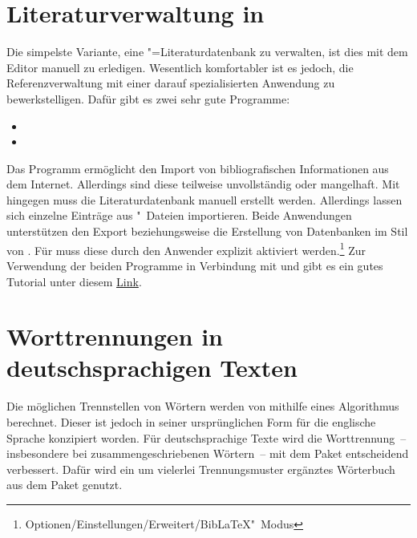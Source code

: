 \section{Literaturverwaltung in }
%
Die simpelste Variante, eine "=Literaturdatenbank zu verwalten, 
ist dies mit dem Editor manuell zu erledigen. Wesentlich komfortabler ist es 
jedoch, die Referenzverwaltung mit einer darauf spezialisierten Anwendung zu 
bewerkstelligen. Dafür gibt es zwei sehr gute Programme:
%
\begin{itemize}
\item {}
\item {}
\end{itemize}
%
Das Programm  ermöglicht den Import von bibliografischen 
Informationen aus dem Internet. Allerdings sind diese teilweise unvollständig 
oder mangelhaft. Mit  hingegen muss die Literaturdatenbank 
manuell erstellt werden. Allerdings lassen sich einzelne Einträge aus 
"~Dateien importieren. Beide Anwendungen unterstützen den Export 
beziehungsweise die Erstellung von Datenbanken im Stil von . 
Für  muss diese durch den Anwender explizit aktiviert 
werden.\footnote{Optionen/Einstellungen/Erweitert/BibLaTeX"~Modus} 
Zur Verwendung der beiden Programme in Verbindung mit  und 
 gibt es ein gutes Tutorial unter diesem
\href{http://www.suedraum.de/latex/stammtisch/degenkolb_latex_biblatex_folien-final.pdf}{Link}.



\section{Worttrennungen in deutschsprachigen Texten}
%
Die möglichen Trennstellen von Wörtern werden von  mithilfe 
eines Algorithmus berechnet. Dieser ist jedoch in seiner ursprünglichen Form 
für die englische Sprache konzipiert worden. Für deutschsprachige Texte wird 
die Worttrennung~-- insbesondere bei zusammengeschriebenen Wörtern~-- mit dem 
Paket  entscheidend verbessert. Dafür wird ein um vielerlei 
Trennungsmuster ergänztes Wörterbuch aus dem Paket  
genutzt. 

